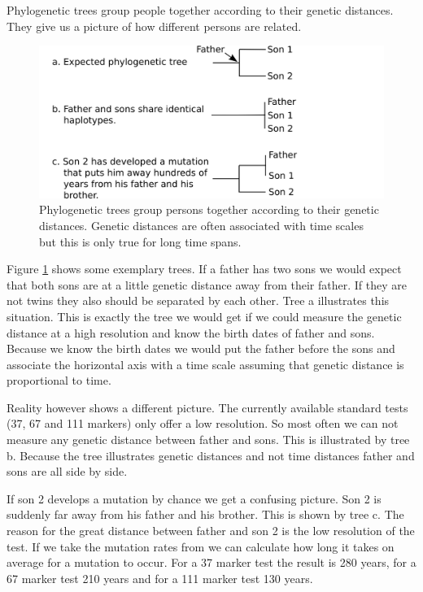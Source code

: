 Phylogenetic trees group people together according to their
genetic distances. They give us a picture of how different
persons are related.

\begin{figure}[ht]
\centering
\includegraphics[width=13cm]{img/phylotrees.png}
\caption{\label{phylotrees} Phylogenetic trees group persons
together according to their genetic distances. Genetic
distances are often associated with time scales but this
is only true for long time spans.}
\end{figure}

Figure \ref{phylotrees} shows some exemplary trees. If a
father has two sons we would expect that both sons are at
a little genetic distance away from their father. If they
are not twins they also should be separated by each other.
Tree a illustrates this situation. This is exactly the
tree we would get if we could measure the genetic distance
at a high resolution and know the birth dates of father and
sons. Because we know the birth dates we would put the father
before the sons and associate the horizontal axis with a
time scale assuming that genetic distance is proportional
to time.

Reality however shows a different picture. The currently
available standard tests (37, 67 and 111 markers) only offer
a low resolution. So most often we can not measure any genetic
distance between father and sons. This is illustrated by
tree b. Because the tree illustrates genetic distances and
not time distances father and sons are all side by side.

If son 2 develops a mutation by chance we get a confusing picture.
Son 2 is suddenly far away from his father and his brother.
This is shown by tree c. The reason for the great distance
between father and son 2 is the low resolution of the test.
If we take the mutation rates from \cite{Kly12} we can
calculate how long it takes on average for a mutation to
occur. For a 37 marker test the result is 280 years, for
a 67 marker test 210 years and for a 111 marker test 130
years. 

